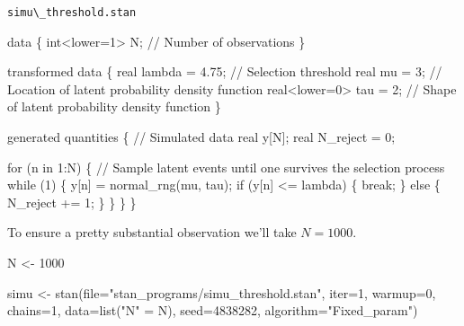 \documentclass[
  letterpaper,
  DIV=11,
  numbers=noendperiod]{scrartcl}
\newenvironment{Shaded}{\begin{snugshade}}{\end{snugshade}}
\newcommand{\AttributeTok}[1]{\textcolor[rgb]{0.40,0.45,0.13}{#1}}
\newcommand{\CommentTok}[1]{\textcolor[rgb]{0.37,0.37,0.37}{#1}}
\newcommand{\ControlFlowTok}[1]{\textcolor[rgb]{0.00,0.23,0.31}{#1}}
\newcommand{\DataTypeTok}[1]{\textcolor[rgb]{0.68,0.00,0.00}{#1}}
\newcommand{\DecValTok}[1]{\textcolor[rgb]{0.68,0.00,0.00}{#1}}
\newcommand{\FloatTok}[1]{\textcolor[rgb]{0.68,0.00,0.00}{#1}}
\newcommand{\FunctionTok}[1]{\textcolor[rgb]{0.28,0.35,0.67}{#1}}
\newcommand{\KeywordTok}[1]{\textcolor[rgb]{0.00,0.23,0.31}{#1}}
\newcommand{\NormalTok}[1]{\textcolor[rgb]{0.00,0.23,0.31}{#1}}
\newcommand{\OtherTok}[1]{\textcolor[rgb]{0.00,0.23,0.31}{#1}}
\newcommand{\StringTok}[1]{\textcolor[rgb]{0.13,0.47,0.30}{#1}}
\begin{document}
\begin{codelisting}

\caption{\texttt{simu\textbackslash\_threshold.stan}}

\begin{Shaded}
\begin{Highlighting}[]
\KeywordTok{data}\NormalTok{ \{}
  \DataTypeTok{int}\NormalTok{\textless{}}\KeywordTok{lower}\NormalTok{=}\DecValTok{1}\NormalTok{\textgreater{} N; }\CommentTok{// Number of observations}
\NormalTok{\}}

\KeywordTok{transformed data}\NormalTok{ \{}
  \DataTypeTok{real}\NormalTok{ lambda = }\FloatTok{4.75}\NormalTok{;    }\CommentTok{// Selection threshold}
  \DataTypeTok{real}\NormalTok{ mu = }\DecValTok{3}\NormalTok{;           }\CommentTok{// Location of latent probability density function}
  \DataTypeTok{real}\NormalTok{\textless{}}\KeywordTok{lower}\NormalTok{=}\DecValTok{0}\NormalTok{\textgreater{} tau = }\DecValTok{2}\NormalTok{; }\CommentTok{// Shape of latent probability density function}
\NormalTok{\}}

\KeywordTok{generated quantities}\NormalTok{ \{}
  \CommentTok{// Simulated data}
  \DataTypeTok{real}\NormalTok{ y[N];}
  \DataTypeTok{real}\NormalTok{ N\_reject = }\DecValTok{0}\NormalTok{;}
  
  \ControlFlowTok{for}\NormalTok{ (n }\ControlFlowTok{in} \DecValTok{1}\NormalTok{:N) \{}
    \CommentTok{// Sample latent events until one survives the selection process}
    \ControlFlowTok{while}\NormalTok{ (}\DecValTok{1}\NormalTok{) \{}
\NormalTok{      y[n] = normal\_rng(mu, tau);}
      \ControlFlowTok{if}\NormalTok{ (y[n] \textless{}= lambda) \{}
        \ControlFlowTok{break}\NormalTok{;}
\NormalTok{      \} }\ControlFlowTok{else}\NormalTok{ \{}
\NormalTok{        N\_reject += }\DecValTok{1}\NormalTok{;}
\NormalTok{      \}}
\NormalTok{    \}}
\NormalTok{  \}}
\NormalTok{\}}
\end{Highlighting}
\end{Shaded}

\end{codelisting}

To ensure a pretty substantial observation we'll take \(N = 1000\).

\begin{Shaded}
\begin{Highlighting}[]
\NormalTok{N }\OtherTok{\textless{}{-}} \DecValTok{1000}

\NormalTok{simu }\OtherTok{\textless{}{-}} \FunctionTok{stan}\NormalTok{(}\AttributeTok{file=}\StringTok{"stan\_programs/simu\_threshold.stan"}\NormalTok{,}
             \AttributeTok{iter=}\DecValTok{1}\NormalTok{, }\AttributeTok{warmup=}\DecValTok{0}\NormalTok{, }\AttributeTok{chains=}\DecValTok{1}\NormalTok{, }\AttributeTok{data=}\FunctionTok{list}\NormalTok{(}\StringTok{"N"} \OtherTok{=}\NormalTok{ N),}
             \AttributeTok{seed=}\DecValTok{4838282}\NormalTok{, }\AttributeTok{algorithm=}\StringTok{"Fixed\_param"}\NormalTok{)}
\end{Highlighting}
\end{Shaded}
\end{document}
